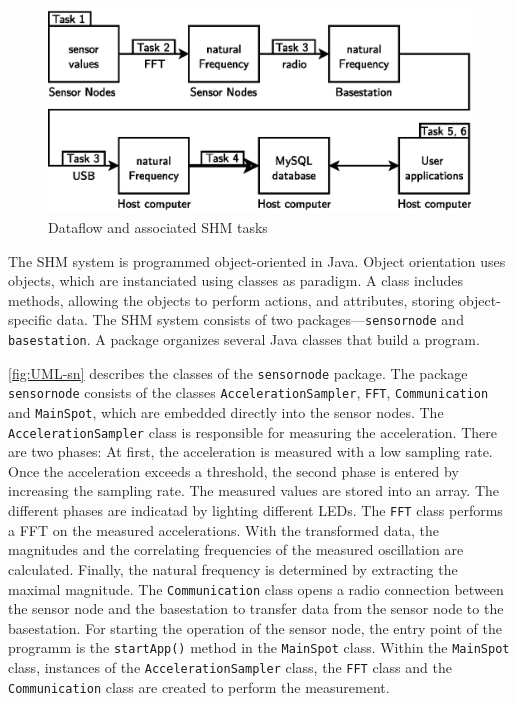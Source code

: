 \documentclass[12pt,a4paper]{scrartcl}
\begin{document}
\begin{figure}[ht]
    \centering
    \includegraphics{figures/dataflow_tasks.eps}
    \caption{Dataflow and associated SHM tasks}
    \label{fig:flow}
\end{figure}

The SHM system is programmed object-oriented in Java. 
Object orientation uses objects, which are instanciated using classes as paradigm. 
A class includes methods, allowing the objects to perform actions, and attributes, storing object-specific data.
The SHM system consists of two packages---\texttt{sensornode} and \texttt{basestation}.
A package organizes several Java classes that build a program.

\autoref{fig:UML-sn} describes the classes of the \texttt{sensor\-node} package.
The package \texttt{sensor\-node} consists of the classes \texttt{Acceleration\-Sampler}, \texttt{FFT}, \texttt{Communi\-cation} and \texttt{Main\-Spot}, which are embedded directly into the sensor nodes.
The \texttt{Acceleration\-Sampler} class is responsible for measuring the acceleration.
There are two phases: At first, the acceleration is measured with a low sampling rate.
Once the acceleration exceeds a threshold, the second phase is entered by increasing the sampling rate. 
The measured values are stored into an array.
The different phases are indicatad by lighting different LEDs.
The \texttt{FFT} class performs a FFT on the measured accelerations. 
With the transformed data, the magnitudes and the correlating frequencies of the measured oscillation are calculated.
Finally, the natural frequency is determined by extracting the maximal magnitude.
The \texttt{Communi\-cation} class opens a radio connection between the sensor node and the basestation to transfer data from the sensor node to the basestation.
For starting the operation of the sensor node, the entry point of the programm is the \texttt{start\-App()} method in the \texttt{Main\-Spot} class. 
Within the \texttt{Main\-Spot} class, instances of the \texttt{Acceleration\-Sampler} class, the \texttt{FFT} class and the \texttt{Communication} class are created to perform the measurement.
\end{document}
